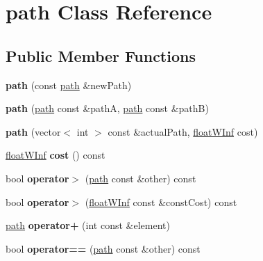 \hypertarget{classpath}{
\section{path Class Reference}
\label{classpath}
}
\subsection*{Public Member Functions}
\begin{DoxyCompactItemize}
\item 
\hypertarget{classpath_a0ab343274a097f91a6f3148c5eab3681}{
{\bfseries path} (const \hyperlink{classpath}{path} \&newPath)}
\label{classpath_a0ab343274a097f91a6f3148c5eab3681}

\item 
\hypertarget{classpath_aa76c6706b88f9df1621a7ccacc138511}{
{\bfseries path} (\hyperlink{classpath}{path} const \&pathA, \hyperlink{classpath}{path} const \&pathB)}
\label{classpath_aa76c6706b88f9df1621a7ccacc138511}

\item 
\hypertarget{classpath_a738ad14f11fa537bf5831f8509794f05}{
{\bfseries path} (vector$<$ int $>$ const \&actualPath, \hyperlink{classfloatWInf}{floatWInf} cost)}
\label{classpath_a738ad14f11fa537bf5831f8509794f05}

\item 
\hypertarget{classpath_a6b5c61cf4d693e41b5d47f969bfc4713}{
\hyperlink{classfloatWInf}{floatWInf} {\bfseries cost} () const }
\label{classpath_a6b5c61cf4d693e41b5d47f969bfc4713}

\item 
\hypertarget{classpath_a4f17aef505a977314fee132a2f23e78a}{
bool {\bfseries operator$>$} (\hyperlink{classpath}{path} const \&other) const }
\label{classpath_a4f17aef505a977314fee132a2f23e78a}

\item 
\hypertarget{classpath_afea81d5978aa1ffb0a30e67a041a9175}{
bool {\bfseries operator$>$} (\hyperlink{classfloatWInf}{floatWInf} const \&constCost) const }
\label{classpath_afea81d5978aa1ffb0a30e67a041a9175}

\item 
\hypertarget{classpath_a73c8d766e03b9d4a2f98bc677011ac67}{
\hyperlink{classpath}{path} {\bfseries operator+} (int const \&element)}
\label{classpath_a73c8d766e03b9d4a2f98bc677011ac67}

\item 
\hypertarget{classpath_ae452af44ecaf2586471ab59081ac1ebf}{
bool {\bfseries operator==} (\hyperlink{classpath}{path} const \&other) const }
\label{classpath_ae452af44ecaf2586471ab59081ac1ebf}


\end{DoxyCompactItemize}

